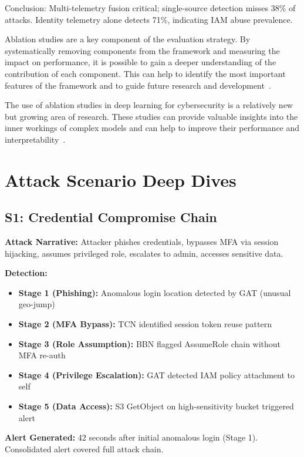 Conclusion: Multi-telemetry fusion critical; single-source detection misses 38\% of attacks. Identity telemetry alone detects 71\%, indicating IAM abuse prevalence.

Ablation studies are a key component of the evaluation strategy. By systematically removing components from the framework and measuring the impact on performance, it is possible to gain a deeper understanding of the contribution of each component. This can help to identify the most important features of the framework and to guide future research and development~\cite{researchgate2024ablation}.

The use of ablation studies in deep learning for cybersecurity is a relatively new but growing area of research. These studies can provide valuable insights into the inner workings of complex models and can help to improve their performance and interpretability~\cite{mdpi2024ablation}.

\section{Attack Scenario Deep Dives}\label{sec:eval-scenarios}
\subsection{S1: Credential Compromise Chain}
\textbf{Attack Narrative:} Attacker phishes credentials, bypasses MFA via session hijacking, assumes privileged role, escalates to admin, accesses sensitive data.

\textbf{Detection:}
\begin{itemize}
    \item \textbf{Stage 1 (Phishing):} Anomalous login location detected by GAT (unusual geo-jump)
    \item \textbf{Stage 2 (MFA Bypass):} TCN identified session token reuse pattern
    \item \textbf{Stage 3 (Role Assumption):} BBN flagged AssumeRole chain without MFA re-auth
    \item \textbf{Stage 4 (Privilege Escalation):} GAT detected IAM policy attachment to self
    \item \textbf{Stage 5 (Data Access):} S3 GetObject on high-sensitivity bucket triggered alert
\end{itemize}

\textbf{Alert Generated:} 42 seconds after initial anomalous login (Stage 1). Consolidated alert covered full attack chain.

